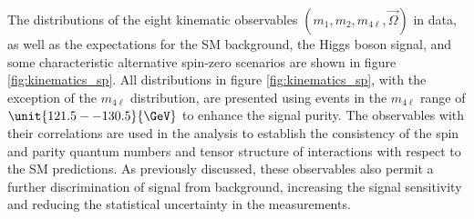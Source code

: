 The distributions of the eight kinematic observables $(m_1, m_2, m_{4\ell}, \vec\Omega)$ in data,
as well as the expectations for the SM background, the Higgs boson signal, and some characteristic alternative
spin-zero scenarios are shown in figure \ref{fig:kinematics_sp}. All distributions in figure \ref{fig:kinematics_sp}, with the exception of the $m_{4\ell}$ distribution, are presented using events in the $m_{4\ell}$ range of $\unit{121.5--130.5}{\GeV}$ to enhance the signal purity. The observables with their correlations are used in the analysis to establish the consistency of the spin and parity quantum numbers and tensor structure of interactions with respect to the SM predictions. As previously discussed, these observables also permit a further discrimination of signal from background, increasing the signal sensitivity and reducing the statistical uncertainty in the measurements.

